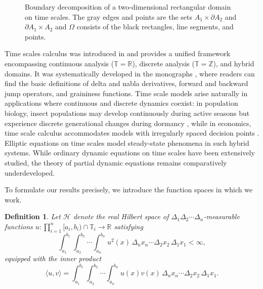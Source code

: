 \documentclass{article}
\newtheorem{definition}[theorem]{Definition}
\numberwithin{equation}{section}
\numberwithin{theorem}{section}
\begin{document}
\begin{figure}[h]
\caption{Boundary decomposition of a two-dimensional rectangular domain on time scales. The gray edges and points are the sets $A_1 \times \partial A_2$ and $\partial A_1 \times A_2$ and $\Omega$ consists of the black rectangles, line segments, and points.}
\label{fig:boundary2D}
\end{figure}

Time scales calculus was introduced in \cite{Hilger1990} and provides a
unified framework encompassing continuous analysis
($\mathbb{T} = \mathbb{R}$), discrete analysis
($\mathbb{T} = \mathbb{Z}$), and hybrid domains. It was systematically
developed in the monographs \cite{BoPe,zbMATH01878575}, where readers
can find the basic definitions of delta and nabla derivatives, forward
and backward jump operators, and graininess functions. Time scale models
arise naturally in applications where continuous and discrete dynamics
coexist: in population biology, insect populations may develop
continuously during active seasons but experience discrete generational
changes during dormancy \cite{Agarwal-Survey, Insect-Seasonal}, while
in economics, time scale calculus accommodates models with irregularly
spaced decision points
\cite{ Economic-Optimization, Siegmund-Stehlik}. Elliptic
equations on time scales model steady-state phenomena in such hybrid
systems. While ordinary dynamic equations on time scales have been
extensively studied, the theory of partial dynamic equations remains
comparatively underdeveloped.

To formulate our results precisely, we introduce the function spaces in which we work. \begin{definition}\label{def:H}
Let $\mathscr{H}$ denote the real Hilbert space of $\Delta_1\Delta_2 \cdots \Delta_n$-measurable functions $u\colon \displaystyle\prod_{i=1}^{n} [a_i, b_i) \cap \mathbb{T}_i \to \mathbb{R}$ satisfying
\[
\int_{a_1}^{b_1} \int_{a_2}^{b_2} \cdots \int_{a_n}^{b_n} u^2(x)\,\Delta_n x_n \cdots \Delta_2 x_2\,\Delta_1 x_1 < \infty,
\]
equipped with the inner product
\[
\langle u, v \rangle = \int_{a_1}^{b_1} \int_{a_2}^{b_2} \cdots \int_{a_n}^{b_n} u(x)v(x)\,\Delta_n x_n \cdots \Delta_2 x_2\,\Delta_1 x_1.
\]
\end{definition}
\end{document}
